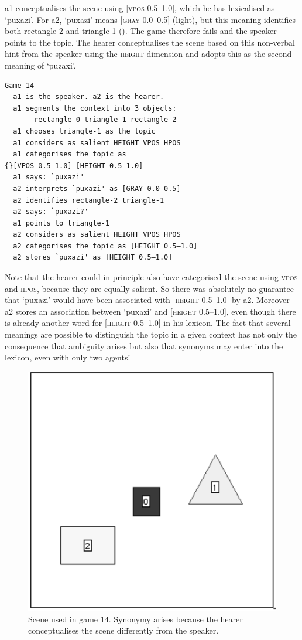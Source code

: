 {\bfshape  a1} conceptualises the scene using 
{}[\textsc{vpos} 0.5–1.0], which he has lexicalised as `puxazi'. 
For {\bfshape  a2}, `puxazi' means [\textsc{gray} 0.0–0.5] (light), but this 
meaning identifies both rectangle-2 and
triangle-1 (). The game therefore
fails and the speaker points to the topic. The hearer
conceptualises the scene based on this non-verbal
hint from the speaker using the \textsc{height} dimension and adopts this as the second meaning 
of `puzaxi'. 
\begin{verbatim}
Game 14
  a1 is the speaker. a2 is the hearer. 
  a1 segments the context into 3 objects: 
       rectangle-0 triangle-1 rectangle-2
  a1 chooses triangle-1 as the topic 
  a1 considers as salient HEIGHT VPOS HPOS 
  a1 categorises the topic as 
{}[VPOS 0.5–1.0] [HEIGHT 0.5–1.0]
  a1 says: `puxazi'
  a2 interprets `puxazi' as [GRAY 0.0–0.5]
  a2 identifies rectangle-2 triangle-1
  a2 says: `puxazi?'
  a1 points to triangle-1
  a2 considers as salient HEIGHT VPOS HPOS 
  a2 categorises the topic as [HEIGHT 0.5–1.0]
  a2 stores `puxazi' as [HEIGHT 0.5–1.0]
\end{verbatim}
Note that the hearer could in principle 
also have categorised the
scene using \textsc{vpos} and \textsc{hpos}, because they are
equally salient. So there was absolutely no 
guarantee that `puxazi' would have been associated 
with [\textsc{height} 0.5–1.0] by {\bfshape  a2}. Moreover {\bfshape  a2} stores
an association between `puxazi' and [\textsc{height} 0.5–1.0], even though 
there is already another word for 
{}[\textsc{height} 0.5–1.0] in his lexicon. The fact that 
several meanings are possible to distinguish the topic in a given 
context has not only the consequence that ambiguity
arises but also that synonyms may enter into the lexicon, 
even with only two agents!


\begin{figure}[htbp]
  \centerline{\includegraphics[width=.40\textwidth]{chap6/figs/scene-game14.pdf}}
\caption{\label{scene-game14}Scene used
in game 14. Synonymy arises because the hearer conceptualises
the scene differently from the speaker.}
\end{figure}

